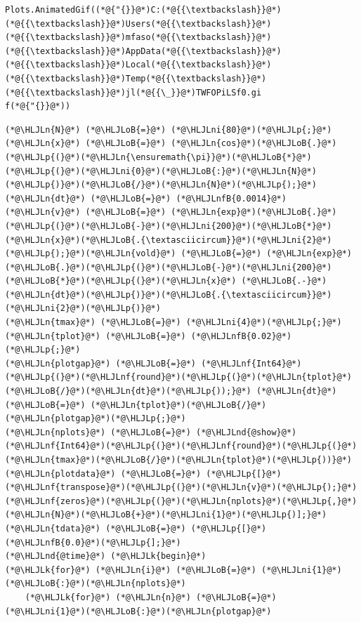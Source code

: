 \documentclass[12pt,a4paper]{article}
\newcommand{\HLJLk}[1]{\textcolor[RGB]{148,91,176}{\textbf{#1}}}
\newcommand{\HLJLn}[1]{#1}
\newcommand{\HLJLnd}[1]{\textcolor[RGB]{214,102,97}{#1}}
\newcommand{\HLJLnf}[1]{\textcolor[RGB]{66,102,213}{#1}}
\newcommand{\HLJLnfB}[1]{\textcolor[RGB]{59,151,46}{#1}}
\newcommand{\HLJLni}[1]{\textcolor[RGB]{59,151,46}{#1}}
\newcommand{\HLJLoB}[1]{\textcolor[RGB]{102,102,102}{\textbf{#1}}}
\newcommand{\HLJLp}[1]{#1}
\begin{document}
\begin{lstlisting}
Plots.AnimatedGif((*@{"{}}@*)C:(*@{{\textbackslash}}@*)(*@{{\textbackslash}}@*)Users(*@{{\textbackslash}}@*)(*@{{\textbackslash}}@*)mfaso(*@{{\textbackslash}}@*)(*@{{\textbackslash}}@*)AppData(*@{{\textbackslash}}@*)(*@{{\textbackslash}}@*)Local(*@{{\textbackslash}}@*)(*@{{\textbackslash}}@*)Temp(*@{{\textbackslash}}@*)(*@{{\textbackslash}}@*)jl(*@{{\_}}@*)TWFOPiLSf0.gi
f(*@{"{}}@*))
\end{lstlisting}


\begin{lstlisting}
(*@\HLJLn{N}@*) (*@\HLJLoB{=}@*) (*@\HLJLni{80}@*)(*@\HLJLp{;}@*) (*@\HLJLn{x}@*) (*@\HLJLoB{=}@*) (*@\HLJLn{cos}@*)(*@\HLJLoB{.}@*)(*@\HLJLp{(}@*)(*@\HLJLn{\ensuremath{\pi}}@*)(*@\HLJLoB{*}@*)(*@\HLJLp{(}@*)(*@\HLJLni{0}@*)(*@\HLJLoB{:}@*)(*@\HLJLn{N}@*)(*@\HLJLp{)}@*)(*@\HLJLoB{/}@*)(*@\HLJLn{N}@*)(*@\HLJLp{);}@*) 
(*@\HLJLn{dt}@*) (*@\HLJLoB{=}@*) (*@\HLJLnfB{0.0014}@*)
(*@\HLJLn{v}@*) (*@\HLJLoB{=}@*) (*@\HLJLn{exp}@*)(*@\HLJLoB{.}@*)(*@\HLJLp{(}@*)(*@\HLJLoB{-}@*)(*@\HLJLni{200}@*)(*@\HLJLoB{*}@*)(*@\HLJLn{x}@*)(*@\HLJLoB{.{\textasciicircum}}@*)(*@\HLJLni{2}@*)(*@\HLJLp{);}@*)(*@\HLJLn{vold}@*) (*@\HLJLoB{=}@*) (*@\HLJLn{exp}@*)(*@\HLJLoB{.}@*)(*@\HLJLp{(}@*)(*@\HLJLoB{-}@*)(*@\HLJLni{200}@*)(*@\HLJLoB{*}@*)(*@\HLJLp{(}@*)(*@\HLJLn{x}@*) (*@\HLJLoB{.-}@*) (*@\HLJLn{dt}@*)(*@\HLJLp{)}@*)(*@\HLJLoB{.{\textasciicircum}}@*)(*@\HLJLni{2}@*)(*@\HLJLp{)}@*)
(*@\HLJLn{tmax}@*) (*@\HLJLoB{=}@*) (*@\HLJLni{4}@*)(*@\HLJLp{;}@*) (*@\HLJLn{tplot}@*) (*@\HLJLoB{=}@*) (*@\HLJLnfB{0.02}@*)(*@\HLJLp{;}@*)
(*@\HLJLn{plotgap}@*) (*@\HLJLoB{=}@*) (*@\HLJLnf{Int64}@*)(*@\HLJLp{(}@*)(*@\HLJLnf{round}@*)(*@\HLJLp{(}@*)(*@\HLJLn{tplot}@*)(*@\HLJLoB{/}@*)(*@\HLJLn{dt}@*)(*@\HLJLp{));}@*) (*@\HLJLn{dt}@*) (*@\HLJLoB{=}@*) (*@\HLJLn{tplot}@*)(*@\HLJLoB{/}@*)(*@\HLJLn{plotgap}@*)(*@\HLJLp{;}@*)
(*@\HLJLn{nplots}@*) (*@\HLJLoB{=}@*) (*@\HLJLnd{@show}@*) (*@\HLJLnf{Int64}@*)(*@\HLJLp{(}@*)(*@\HLJLnf{round}@*)(*@\HLJLp{(}@*)(*@\HLJLn{tmax}@*)(*@\HLJLoB{/}@*)(*@\HLJLn{tplot}@*)(*@\HLJLp{))}@*)
(*@\HLJLn{plotdata}@*) (*@\HLJLoB{=}@*) (*@\HLJLp{[}@*)(*@\HLJLnf{transpose}@*)(*@\HLJLp{(}@*)(*@\HLJLn{v}@*)(*@\HLJLp{);}@*) (*@\HLJLnf{zeros}@*)(*@\HLJLp{(}@*)(*@\HLJLn{nplots}@*)(*@\HLJLp{,}@*)(*@\HLJLn{N}@*)(*@\HLJLoB{+}@*)(*@\HLJLni{1}@*)(*@\HLJLp{)];}@*) (*@\HLJLn{tdata}@*) (*@\HLJLoB{=}@*) (*@\HLJLp{[}@*)(*@\HLJLnfB{0.0}@*)(*@\HLJLp{];}@*)
(*@\HLJLnd{@time}@*) (*@\HLJLk{begin}@*)
(*@\HLJLk{for}@*) (*@\HLJLn{i}@*) (*@\HLJLoB{=}@*) (*@\HLJLni{1}@*)(*@\HLJLoB{:}@*)(*@\HLJLn{nplots}@*)
    (*@\HLJLk{for}@*) (*@\HLJLn{n}@*) (*@\HLJLoB{=}@*) (*@\HLJLni{1}@*)(*@\HLJLoB{:}@*)(*@\HLJLn{plotgap}@*)

\end{lstlisting}
\end{document}
